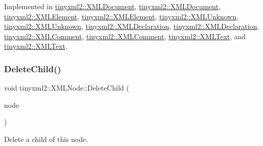 Implemented in \hyperlink{classtinyxml2_1_1XMLDocument_a9efa54f7ecb37c17ab1fa2b3078ccca1}{tinyxml2\+::\+X\+M\+L\+Document}, \hyperlink{classtinyxml2_1_1XMLDocument_ab7be651917a35ab1ff0e4e6d4e565cdf}{tinyxml2\+::\+X\+M\+L\+Document}, \hyperlink{classtinyxml2_1_1XMLElement_a3ea8a40e788fb9ad876c28a32932c6d5}{tinyxml2\+::\+X\+M\+L\+Element}, \hyperlink{classtinyxml2_1_1XMLElement_a9b2119831e8b85827d5d3e5076788e4a}{tinyxml2\+::\+X\+M\+L\+Element}, \hyperlink{classtinyxml2_1_1XMLUnknown_a70983aa1b1cff3d3aa6d4d0a80e5ee48}{tinyxml2\+::\+X\+M\+L\+Unknown}, \hyperlink{classtinyxml2_1_1XMLUnknown_a8a06b8c82117ca969a432e17a46830fc}{tinyxml2\+::\+X\+M\+L\+Unknown}, \hyperlink{classtinyxml2_1_1XMLDeclaration_a5f376019fb34752eb248548f42f32045}{tinyxml2\+::\+X\+M\+L\+Declaration}, \hyperlink{classtinyxml2_1_1XMLDeclaration_acf47629d9fc08ed6f1c164a97bcf794b}{tinyxml2\+::\+X\+M\+L\+Declaration}, \hyperlink{classtinyxml2_1_1XMLComment_a4a33dc32fae0285b03f9cfcb3e43e122}{tinyxml2\+::\+X\+M\+L\+Comment}, \hyperlink{classtinyxml2_1_1XMLComment_a27b37d16cea01b5329dfbbb4f9508e39}{tinyxml2\+::\+X\+M\+L\+Comment}, \hyperlink{classtinyxml2_1_1XMLText_a1b2c1448f1a21299d0a7913f18b55206}{tinyxml2\+::\+X\+M\+L\+Text}, and \hyperlink{classtinyxml2_1_1XMLText_a537c60d7e18fb59c45ac2737a29ac47a}{tinyxml2\+::\+X\+M\+L\+Text}.

\mbox{\label{classtinyxml2_1_1XMLNode_a363b6edbd6ebd55f8387d2b89f2b0921}} 
\subsubsection{\texorpdfstring{Delete\+Child()}{DeleteChild()}\hspace{0.1cm}{\footnotesize\ttfamily [1/2]}}
{\footnotesize\ttfamily void tinyxml2\+::\+X\+M\+L\+Node\+::\+Delete\+Child (\begin{DoxyParamCaption}\item[{\hyperlink{classtinyxml2_1_1XMLNode}{X\+M\+L\+Node} $\ast$}]{node }\end{DoxyParamCaption})}

Delete a child of this node. \mbox{\label{classtinyxml2_1_1XMLNode_a363b6edbd6ebd55f8387d2b89f2b0921}} 
